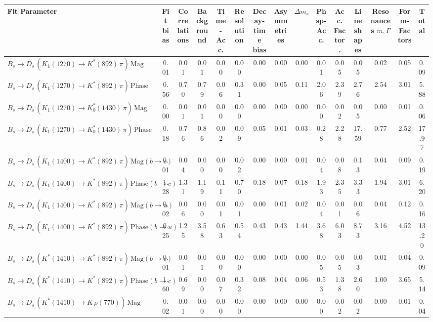 \begin{tabular}{l  c  c  c  c  c  c  c  c  c  c  c  c  c  | c }
\hline
\hline
Fit Parameter & Fit bias & Correlations & Background & Time-Acc. & Resolution & Decay-time bias & Asymmetries & $\Delta m_{s}$ & Phsp-Acc. & Acc. Factor. & Lineshapes & Resonances $m,\Gamma$ & Form-Factors &  Total  \\ 
\hline
$B_s \to D_s \, ( K_1(1270) \to K^{*}(892) \, \pi ) \, \text{Mag}$ & 0.01 & 0.01 & 0.01 & 0.00 & 0.00 & 0.00 & 0.00 & 0.00 & 0.01 & 0.05 & 0.05 & 0.02 & 0.05 & 0.09 \\ 
$B_s \to D_s \, ( K_1(1270) \to K^{*}(892) \, \pi ) \, \text{Phase}$ & 0.56 & 0.70 & 0.79 & 0.06 & 0.31 & 0.00 & 0.05 & 0.11 & 2.06 & 2.39 & 2.76 & 2.54 & 3.01 & 5.88 \\ 
$B_s \to D_s \, ( K_1(1270) \to K^{*}_{0}(1430) \, \pi ) \, \text{Mag} $ & 0.00 & 0.01 & 0.01 & 0.00 & 0.00 & 0.00 & 0.00 & 0.00 & 0.00 & 0.02 & 0.05 & 0.00 & 0.01 & 0.06 \\ 
$B_s \to D_s \, ( K_1(1270) \to K^{*}_{0}(1430) \, \pi ) \, \text{Phase} $ & 0.18 & 0.76 & 0.86 & 0.02 & 0.09 & 0.05 & 0.01 & 0.03 & 0.28 & 2.28 & 17.59 & 0.77 & 2.52 & 17.97 \\ 
$B_s \to D_s \, ( K_1(1400) \to K^{*}(892) \, \pi ) \, \text{Mag} (b \to c)$ & 0.01 & 0.04 & 0.00 & 0.00 & 0.02 & 0.00 & 0.00 & 0.01 & 0.04 & 0.08 & 0.13 & 0.04 & 0.09 & 0.19 \\ 
$B_s \to D_s \, ( K_1(1400) \to K^{*}(892) \, \pi ) \, \text{Phase} (b \to c)$ & 1.28 & 1.31 & 1.19 & 0.11 & 0.70 & 0.18 & 0.07 & 0.18 & 1.93 & 2.35 & 3.33 & 1.94 & 3.01 & 6.20 \\ 
$B_s \to D_s \, ( K_1(1400) \to K^{*}(892) \, \pi ) \, \text{Mag} (b \to u)$ & 0.02 & 0.06 & 0.00 & 0.01 & 0.01 & 0.00 & 0.01 & 0.02 & 0.04 & 0.01 & 0.06 & 0.04 & 0.12 & 0.16 \\ 
$B_s \to D_s \, ( K_1(1400) \to K^{*}(892) \, \pi ) \, \text{Phase} (b \to u)$ & 0.25 & 1.25 & 3.58 & 0.63 & 0.54 & 0.43 & 0.43 & 1.44 & 3.68 & 6.03 & 8.73 & 3.16 & 4.52 & 13.20 \\ 
$B_s \to D_s \, ( K^{*}(1410) \to K^{*}(892) \, \pi ) \, \text{Mag} (b \to c)$ & 0.01 & 0.01 & 0.01 & 0.00 & 0.00 & 0.00 & 0.00 & 0.00 & 0.05 & 0.05 & 0.03 & 0.01 & 0.04 & 0.09 \\ 
$B_s \to D_s \, ( K^{*}(1410) \to K^{*}(892) \, \pi ) \, \text{Phase} (b \to c)$ & 1.60 & 0.69 & 0.00 & 0.07 & 0.32 & 0.08 & 0.04 & 0.06 & 0.53 & 1.38 & 2.60 & 1.00 & 3.65 & 5.14 \\ 
$B_s \to D_s \, ( K^{*}(1410) \to K \, \rho(770) ) \, \text{Mag}$ & 0.02 & 0.01 & 0.00 & 0.00 & 0.00 & 0.00 & 0.00 & 0.00 & 0.00 & 0.02 & 0.02 & 0.00 & 0.01 & 0.04 \\ 

\end{tabular}

